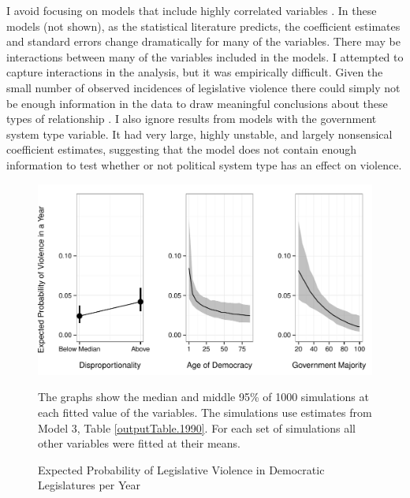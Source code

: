 \documentclass[a4paper]{article}\usepackage[]{graphicx}\usepackage[]{color}
\newenvironment{knitrout}{}{} %
\begin{document}
I avoid focusing on models that include highly correlated variables \citep[]{Achen2002, Schrodt2006}. In these models (not shown), as the statistical literature predicts, the coefficient estimates and standard errors change dramatically for many of the variables. There may be interactions between many of the variables included in the models. I attempted to capture interactions in the analysis, but it was empirically difficult. Given the small number of observed incidences of legislative violence there could simply not be enough information in the data to draw meaningful conclusions about these types of relationship \citep[]{Brambor2006}. I also ignore results from models with the government system type variable. It had very large, highly unstable, and largely nonsensical coefficient estimates, suggesting that the model does not contain enough information to test \citep{Babyak2004} whether or not political system type has an effect on violence.

\begin{figure}[t]
    \begin{center}

\begin{knitrout}
\color{fgcolor}
\includegraphics[width=0.95\linewidth]{figure/predProb-1} 

\end{knitrout}
    \end{center}
    \caption{Expected Probability of Legislative Violence in Democratic Legislatures per Year}
    \label{pred_prob}
    \begin{singlespace}
      {\scriptsize{The graphs show the median and middle 95\% of 1000 simulations at each fitted value of the variables. The simulations use estimates from Model 3, Table \ref{outputTable.1990}. For each set of simulations all other variables were fitted at their means.}}
    \end{singlespace}
\end{figure}
\end{document}
